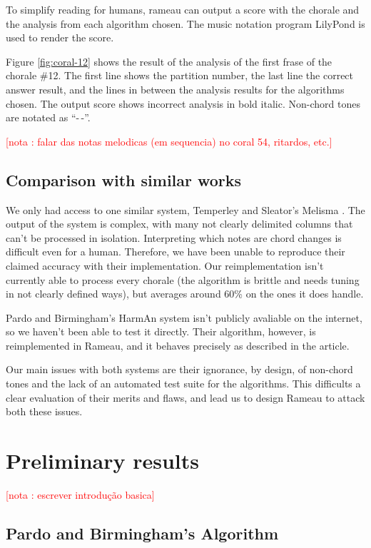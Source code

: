 \documentclass{article}
\newcounter{notacounter}
\newcommand{\nota}[1]{
  \addtocounter{notacounter}{1}
  \textcolor{red}{[nota \arabic{notacounter}: #1]}
}
\begin{document}
To simplify reading for humans, rameau can output a score with the
chorale and the analysis from each algorithm chosen. The music
notation program LilyPond is used to render the score.

Figure \ref{fig:coral-12} shows the result of the analysis of the
first frase of the chorale \#12. The first line shows the partition
number, the last line the correct answer result, and the lines in
between the analysis results for the algorithms chosen. The output
score shows incorrect analysis in bold italic. Non-chord tones are
notated as ``-\,-''.

\nota{falar das notas melodicas (em sequencia) no coral 54, ritardos,
  etc.}

\subsection{Comparison with similar works}
\label{sec:differences-from-similar-software}

We only had access to one similar system, Temperley and Sleator's
Melisma \cite{temperley99:modeling}. The output of the system is
complex, with many not clearly delimited columns that can't be
processed in isolation. Interpreting which notes are chord changes is
difficult even for a human. Therefore, we have been unable to
reproduce their claimed accuracy with their implementation. Our
reimplementation isn't currently able to process every chorale (the
algorithm is brittle and needs tuning in not clearly defined ways),
but averages around 60\% on the ones it does handle.

Pardo and Birmingham's HarmAn \cite{pardo99:automated} system isn't
publicly avaliable on the internet, so we haven't been able to test it
directly. Their algorithm, however, is reimplemented in Rameau, and it
behaves precisely as described in the article.

Our main issues with both systems are their ignorance, by design, of
non-chord tones and the lack of an automated test suite for the
algorithms. This difficults a clear evaluation of their merits and
flaws, and lead us to design Rameau to attack both these issues.


\section{Preliminary results}
\label{sec:analysis-results}

\nota{escrever introdução basica}

\subsection{Pardo and Birmingham's Algorithm}
\label{sec:pardo-birmingham}
\end{document}
